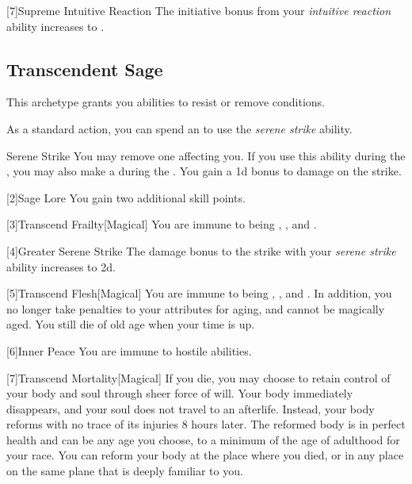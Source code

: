         [7]{Supreme Intuitive Reaction}
        The initiative bonus from your \textit{intuitive reaction} ability increases to .

    \subsection{Transcendent Sage}
        This archetype grants you abilities to resist or remove conditions.

         As a standard action, you can spend an  to use the \textit{serene strike} ability.
        \begin{ability}{Serene Strike}
            You may remove one  affecting you.
            If you use this ability during the , you may also make a  during the .
            You gain a \plus1d bonus to damage on the strike.
        \end{ability}

        [2]{Sage Lore} You gain two additional skill points.

        [3]{Transcend Frailty}[Magical]
        You are immune to being , , and .

        [4]{Greater Serene Strike} The damage bonus to the strike with your \textit{serene strike} ability increases to \plus2d.

        [5]{Transcend Flesh}[Magical]
        You are immune to being , , and .
        In addition, you no longer take penalties to your attributes for aging, and cannot be magically aged.
        You still die of old age when your time is up.

        [6]{Inner Peace}
        You are immune to hostile  abilities.

        [7]{Transcend Mortality}[Magical]
        If you die, you may choose to retain control of your body and soul through sheer force of will.
        Your body immediately disappears, and your soul does not travel to an afterlife.
        Instead, your body reforms with no trace of its injuries 8 hours later.
        The reformed body is in perfect health and can be any age you choose, to a minimum of the age of adulthood for your race.
        You can reform your body at the place where you died, or in any place on the same plane that is deeply familiar to you.

